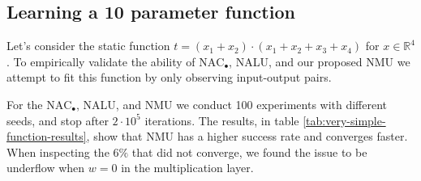 \subsection{Learning a 10 parameter function}
Let's consider the static function $t = (x_1 + x_2) \cdot (x_1 + x_2 + x_3 + x_4)$ for $x \in \mathbb{R}^4$. To empirically validate the ability of $\mathrm{NAC}_{\bullet}$, NALU, and our proposed NMU we attempt to fit this function by only observing input-output pairs.

For the $\mathrm{NAC}_{\bullet}$, NALU, and NMU we conduct 100 experiments with different seeds, and stop after $2 \cdot 10^5$ iterations. The results, in table \ref{tab:very-simple-function-results}, show that NMU has a higher success rate and converges faster.
When inspecting the $6\%$ that did not converge, we found the issue to be underflow when $w = 0$ in the multiplication layer.

